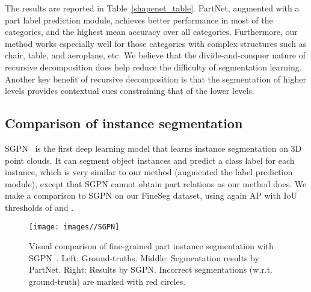 The results are reported in Table~\ref{shapenet_table}. PartNet, augmented with a part label prediction module, achieves better performance in most of the categories, and the highest mean accuracy over all categories. Furthermore, our method works especially well for those categories with complex structures such as chair, table, and aeroplane, etc. We believe that the divide-and-conquer nature of recursive decomposition does help reduce the difficulty of segmentation learning. Another key benefit of recursive decomposition is that the segmentation of higher levels provides contextual cues constraining that of the lower levels.


\subsection{Comparison of instance segmentation}
SGPN~\cite{Wang2017SGPN} is the first deep learning model that learns instance segmentation on 3D point clouds. It can segment object instances and predict a class label for each instance, which is very similar to our method (augmented the label prediction module), except that SGPN cannot obtain part relations as our method does. We make a comparison to SGPN on our FineSeg dataset, using again AP with IoU thresholds of  and .

\begin{figure}[t]
  \centering
  \texttt{[image: images//SGPN]}
  \caption{Visual comparison of fine-grained part instance segmentation with SGPN~\cite{Wang2017SGPN}. Left: Ground-truths. Middle: Segmentation results by PartNet. Right: Results by SGPN. Incorrect segmentations (w.r.t. ground-truth) are marked with red circles.}
  \label{sgpn_figure}\vspace{-5pt}
\end{figure}

